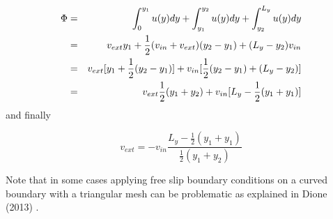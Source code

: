 \begin{eqnarray}
\Phi
&=&\int_{0}^{y_1} u(y) dy  +\int_{y_1}^{y_2} u(y) dy +\int_{y_2}^{L_y} u(y) dy \nonumber\\
&=& v_{ext} y_1  + \frac{1}{2}(v_{in}+v_{ext})(y_2-y_1) + (L_y-y_2) v_{in} \nonumber\\
&=& v_{ext} [y_1 + \frac{1}{2}(y_2-y_1) ] + v_{in} [ \frac{1}{2}(y_2-y_1)  + (L_y-y_2) ] \nonumber\\
&=& v_{ext}\frac{1}{2} (y_1 + y_2 ) + v_{in} [ L_y - \frac{1}{2}(y_1+y_1) ] \nonumber
\end{eqnarray}
and finally
\begin{mdframed}[backgroundcolor=blue!5]
\[
v_{ext} = -v_{in} \frac{ L_y - \frac{1}{2}(y_1+y_1)}{ \frac{1}{2} (y_1 + y_2 ) }
\]
\end{mdframed}

Note that in some cases applying free slip boundary conditions on a curved boundary with a triangular mesh 
can be problematic as explained in Dione \etal (2013) \cite{ditu13}.

\Literature \cite{ensg82}
